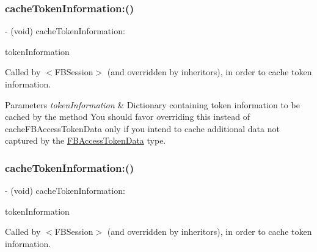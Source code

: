 \subsubsection{\texorpdfstring{cache\+Token\+Information\+:()}{cacheTokenInformation:()}\hspace{0.1cm}{\footnotesize\ttfamily [2/5]}}
{\footnotesize\ttfamily -\/ (void) cache\+Token\+Information\+: \begin{DoxyParamCaption}\item[{(N\+S\+Dictionary $\ast$)}]{token\+Information }\end{DoxyParamCaption}}

Called by $<$\+F\+B\+Session$>$ (and overridden by inheritors), in order to cache token information.


\begin{DoxyParams}{Parameters}
{\em token\+Information} & Dictionary containing token information to be cached by the method  You should favor overriding this instead of {\ttfamily cache\+F\+B\+Access\+Token\+Data} only if you intend to cache additional data not captured by the \hyperlink{interfaceFBAccessTokenData}{F\+B\+Access\+Token\+Data} type. \\
\hline
\end{DoxyParams}
\mbox{\label{interfaceFBSessionTokenCachingStrategy_a89929f2fc1d8d29bb1add6e607d7c864}} 
\subsubsection{\texorpdfstring{cache\+Token\+Information\+:()}{cacheTokenInformation:()}\hspace{0.1cm}{\footnotesize\ttfamily [3/5]}}
{\footnotesize\ttfamily -\/ (void) cache\+Token\+Information\+: \begin{DoxyParamCaption}\item[{(N\+S\+Dictionary $\ast$)}]{token\+Information }\end{DoxyParamCaption}}

Called by $<$\+F\+B\+Session$>$ (and overridden by inheritors), in order to cache token information.


